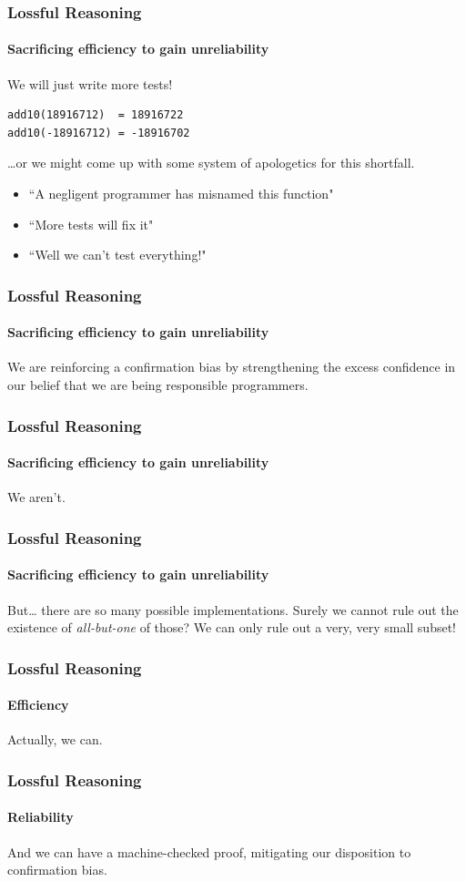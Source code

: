 \begin{frame}[fragile]
\frametitle{Lossful Reasoning}
\framesubtitle{Sacrificing efficiency to gain unreliability}
We will just write more tests!
\begin{lstlisting}[style=scala]
add10(18916712)  = 18916722
add10(-18916712) = -18916702
\end{lstlisting}
\ldots or we might come up with some system of apologetics for this shortfall.
\begin{itemize}
  \item ``A negligent programmer has misnamed this function"
  \item ``More tests will fix it"
  \item ``Well we can't test everything!"
\end{itemize}
\end{frame}

\begin{frame}[fragile]
\frametitle{Lossful Reasoning}
\framesubtitle{Sacrificing efficiency to gain unreliability}
\begin{center}{We are reinforcing a confirmation bias by strengthening 
the excess confidence in our belief that we are being responsible programmers.}
\end{center}
\end{frame}

\begin{frame}[fragile]
\frametitle{Lossful Reasoning}
\framesubtitle{Sacrificing efficiency to gain unreliability}
\begin{center}
We aren't.
\end{center}
\end{frame}

\begin{frame}[fragile]
\frametitle{Lossful Reasoning}
\framesubtitle{Sacrificing efficiency to gain unreliability}
\begin{block}{But\ldots}
there are so many possible implementations. Surely we cannot 
rule out the existence of \emph{all-but-one} of those? We can only rule out a
\scriptsize{very, very} \tiny{small subset}!
\end{block}
\end{frame}

\begin{frame}[fragile]
\frametitle{Lossful Reasoning}
\framesubtitle{Efficiency}
\begin{center}
Actually, we can.
\end{center}
\end{frame}

\begin{frame}[fragile]
\frametitle{Lossful Reasoning}
\framesubtitle{Reliability}
\begin{center}
And we can have a machine-checked proof, mitigating our disposition to
confirmation bias.
\end{center}
\end{frame}
